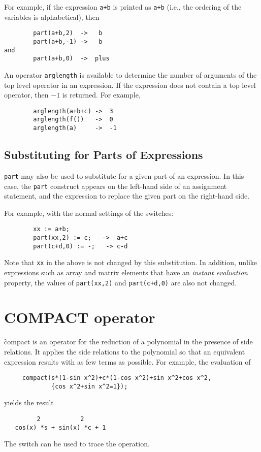 For example, if the expression \texttt{a+b} is printed as \texttt{a+b} (i.e.,
the ordering of the variables is alphabetical), then
\begin{verbatim}
        part(a+b,2)  ->   b
        part(a+b,-1) ->   b
and
        part(a+b,0)  ->  plus
\end{verbatim}
\hypertarget{operator:ARGLENGTH}{}
An operator \texttt{arglength} is available to determine
the number of arguments of the top level operator in an expression.  If
the expression does not contain a top level operator, then $-1$ is returned.
For example,
\begin{verbatim}
        arglength(a+b+c) ->  3
        arglength(f())   ->  0
        arglength(a)     ->  -1
\end{verbatim}

\subsection{Substituting for Parts of Expressions}

\texttt{part} may also be used to substitute for a given part of an
expression.  In this case, the \texttt{part} construct appears on the
left-hand side of an assignment statement, and the expression to replace
the given part on the right-hand side.

For example, with the normal settings of the {\REDUCE} switches:
\begin{verbatim}
        xx := a+b;
        part(xx,2) := c;   ->  a+c
        part(c+d,0) := -;   -> c-d
\end{verbatim}

Note that \texttt{xx} in the above is not changed by this substitution.  In
addition, unlike expressions such as array and matrix elements that have
an \emph{instant evaluation\/} property, the values
of \texttt{part(xx,2)} and \texttt{part(c+d,0)} are also not changed.


\section{COMPACT operator}
\label{sec:COMPACT}

\f{compact} is an operator for the reduction of a polynomial in the
presence of side relations.  It applies the side relations to the
polynomial so that an equivalent expression results with as few terms as
possible.  For example, the evaluation of
\begin{verbatim}
     compact(s*(1-sin x^2)+c*(1-cos x^2)+sin x^2+cos x^2,
             {cos x^2+sin x^2=1});
\end{verbatim}
yields the result
\begin{verbatim}
         2           2
   cos(x) *s + sin(x) *c + 1
\end{verbatim}
\hypertarget{switch:TRCOMPACT}{}
The switch  can be used to trace the operation.

